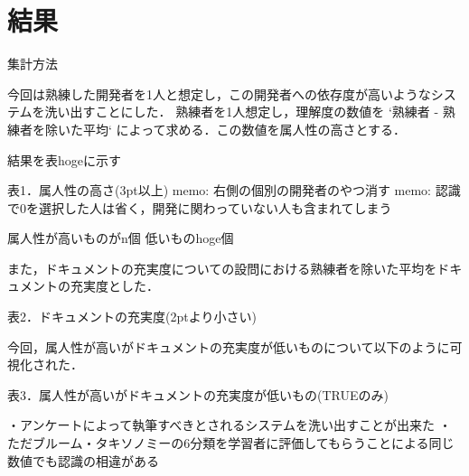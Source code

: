 \section{結果}
集計方法

今回は熟練した開発者を1人と想定し，この開発者への依存度が高いようなシステムを洗い出すことにした．
熟練者を1人想定し，理解度の数値を `熟練者 - 熟練者を除いた平均` によって求める．この数値を属人性の高さとする．

結果を表hogeに示す

表1．属人性の高さ(3pt以上)
memo: 右側の個別の開発者のやつ消す
memo: 認識で0を選択した人は省く，開発に関わっていない人も含まれてしまう

属人性が高いものがn個
低いものhoge個

また，ドキュメントの充実度についての設問における熟練者を除いた平均をドキュメントの充実度とした．

表2．ドキュメントの充実度(2ptより小さい)

今回，属人性が高いがドキュメントの充実度が低いものについて以下のように可視化された．

表3．属人性が高いがドキュメントの充実度が低いもの(TRUEのみ)

・アンケートによって執筆すべきとされるシステムを洗い出すことが出来た
・ただブルーム・タキソノミーの6分類を学習者に評価してもらうことによる同じ数値でも認識の相違がある
